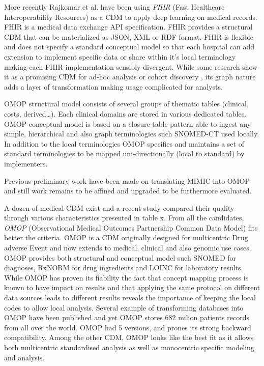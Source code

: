 More recently Rajkomar et al. have been using \emph{FHIR} (Fast Healthcare
Interoperability Resources) as a CDM to apply deep learning on medical records.
FHIR is a medical data exchange API specification. FHIR provides a structural
CDM that can be materialized as JSON, XML or RDF format. FHIR is flexible and
does not specify a standard conceptual model so that each hospital can add
extension to implement specific data or share within it's local terminology
making each FHIR implementation sensibly divergent. While some research show it
as a promising CDM for ad-hoc analysis \cite{fhir-google} or cohort discovery
\cite{fhir-paris}, its graph nature adds a layer of transformation making usage
complicated for analysts. 

OMOP structural model consists of several groups of thematic tables (clinical,
costs, derived\ldots). Each clinical domains are stored in various dedicated
tables.
OMOP conceptual model is based on a closure table pattern \cite{closure-table}
able to ingest any simple, hierarchical and also graph terminologies such
SNOMED-CT used locally. In addition to the local terminologies OMOP specifies
and maintains a set of standard terminologies to be mapped uni-directionally
(local to standard) by implementers.

Previous preliminary work have been made on translating MIMIC into OMOP
\cite{mimic-omop-previous} and still work remains to be affined and upgraded to
be furthermore evaluated.

A dozen of medical CDM exist and a recent study compared their quality
\cite{omop-vs-pcornet} through various characteristics presented in table x.
From all the candidates, \textit{OMOP} (Observational Medical Outcomes
Partnership Common Data Model) fits better the criteria. OMOP is a CDM
originally designed for multicentric Drug adverse Event and now extends to
medical, clinical and also genomic use cases. OMOP provides both structural and
conceptual model such SNOMED for diagnoses, RxNORM for drug ingredients and
LOINC for laboratory results. While OMOP has proven its fiability
\cite{omop-eval} the fact that
concept mapping process is known to have impact on results
\cite{omop-concept-impact} and that applying the same protocol on different
data sources leads to different results \cite{omop-replicability} reveals the
importance of keeping the local codes to allow local analysis. Several example
of transforming databases into OMOP have been published
\cite{omop-german,omop-nashville} and yet OMOP stores 682 milion patients
records from all over the world\cite{omop-bigboy}. OMOP had 5 versions, and
prones its strong backward compatibility.
Among the other CDM, OMOP looks like the best fit as it allows both
multicentric standardised analysis as well as monocentric specific modeling and
analysis. 
\\

